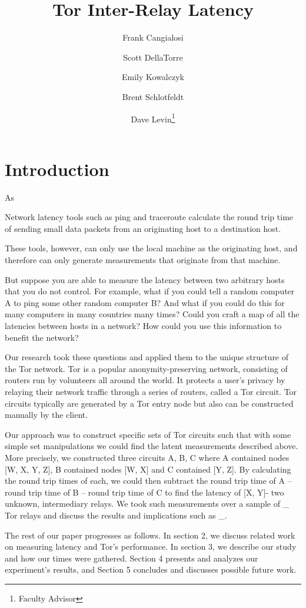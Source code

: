 \documentclass[twocolumn,11pt]{article}
\title{Tor Inter-Relay Latency}
\author[1]{Frank Cangialosi}
\author[1]{Scott DellaTorre}
\author[1]{Emily Kowalczyk}
\author[1]{Brent Schlotfeldt}
\author[1]{Dave Levin\thanks{Faculty Advisor}}
\affil[1]{University of Maryland}
\date{}
\begin{document}
\maketitle

\section {Introduction}

As 

Network latency tools such as ping and traceroute calculate the round trip time of sending small data packets from an originating host to a destination host. \cite{protocol}

These tools, however, can only use the local machine as the originating host, and  therefore can only generate measurements that originate from that machine.

But suppose you are able to measure the latency between two arbitrary hosts that you do not control.  For example, what if you could tell a random computer A to ping some other random computer B?  And what if you could do this for many computers in many countries many times?  Could you craft a map of all the latencies between hosts in a network? How could you use this information to benefit the network?

Our research took these questions and applied them to the unique structure of the Tor network.  Tor is a popular anonymity-preserving network, consisting of routers run by volunteers all around the world.  It protects a user’s privacy by relaying their network traffic through a series of routers, called a Tor circuit.  Tor circuits typically are generated by a Tor entry node but also can be constructed manually by the client.

Our approach was to construct specific sets of Tor circuits such that with some simple set manipulations we could find the latent measurements described above. More precisely, we constructed three circuits A, B, C where A contained nodes [W, X, Y, Z], B contained nodes [W, X] and C contained [Y, Z].  By calculating the round trip times of each, we could then subtract the round trip time of A – round trip time of B – round trip time of C to find the latency of [X, Y]- two unknown, intermediary relays.  We took such measurements over a sample of \_ Tor relays and discuss the results and implications such as \_.

The rest of our paper progresses as follows.  In section 2, we discuss related work on measuring latency and Tor’s performance.  In section 3, we describe our study and how our times were gathered.  Section 4 presents and analyzes our experiment’s results, and Section 5 concludes and discusses possible future work.
\end{document}
